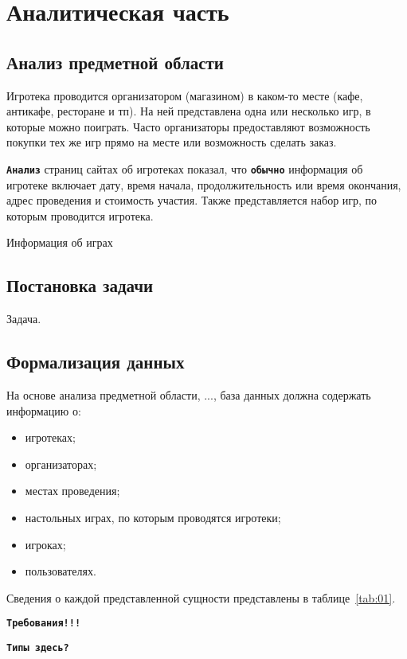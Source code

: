 \chapter{Аналитическая часть}

\section{Анализ предметной области}

Игротека проводится организатором (магазином) в каком-то месте (кафе, антикафе,
ресторане и тп). На ней представлена одна или несколько игр, в которые можно
поиграть. Часто организаторы предоставляют возможность покупки тех же игр прямо
на месте или возможность сделать заказ.

\textbf{\texttt{Анализ}} страниц сайтах об игротеках показал, что
\textbf{\texttt{обычно}} информация об игротеке включает дату, время начала,
продолжительность или время окончания, адрес проведения и стоимость участия.
Также представляется набор игр, по которым проводится игротека.

Информация об играх 

\section{Постановка задачи}

Задача.

\section{Формализация данных}

На основе анализа предметной области, ..., база данных должна содержать
информацию о:

\begin{itemize}
    \item игротеках;
    \item организаторах;
    \item местах проведения;
    \item настольных играх, по которым проводятся игротеки;
    \item игроках;
    \item пользователях.
\end{itemize}

Сведения о каждой представленной сущности представлены в таблице~\ref{tab:01}.

\textbf{\texttt{Требования!!!}}

\textbf{\texttt{Типы здесь?}}

